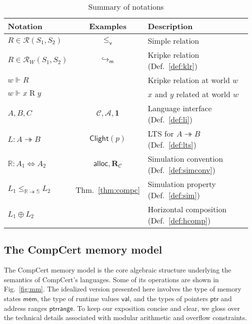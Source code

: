 \documentclass[acmsmall,authordraft]{acmart}
\newcommand{\kw}[1]{\ensuremath{ \mathsf{#1} }}
\newcommand{\que}{\circ}
\newcommand{\ans}{\bullet}
\newcommand{\vref}{\le_\kw{v}}
\begin{document}
\begin{table} %
  \begin{tabular}{lcl}
    \hline
    Notation & Examples & Description \\
    \hline
    $R \in \mathcal{R}(S_1, S_2)$ &
      $\vref$ &
      Simple relation \\
    $R \in \mathcal{R}_W(S_1, S_2)$ &
      $\hookrightarrow_\kw{m}$ &
      Kripke relation (Def.~\ref{def:klr}) \\
    $w \Vdash R$ & &
      Kripke relation at world $w$ \\
    $w \Vdash x \mathrel{R} y$ & &
      $x$ and $y$ related at world $w$ \\
    \hline
    $A, B, C$ &
      $\mathcal{C}, \mathcal{A}, \mathbf{1}$ &
      Language interface (Def.~\ref{def:li}) \\
    $L : A \twoheadrightarrow B$ &
      $\kw{Clight}(p)$ &
      LTS for $A \twoheadrightarrow B$ (Def.~\ref{def:lts}) \\
    $\mathbb{R} : A_1 \Leftrightarrow A_2$ &
      $\kw{alloc}, \mathbf{R}_\mathcal{C}$ &
      Simulation convention (Def.~\ref{def:simconv}) \\
    $L_1 \le_{\mathbb{R} \twoheadrightarrow \mathbb{S}} L_2$ &
      Thm.~\ref{thm:compc} &
      Simulation property (Def.~\ref{def:sim}) \\
    $L_1 \oplus L_2$ & &
      Horizontal composition (Def.~\ref{def:hcomp}) \\
    \hline
  \end{tabular}
  \caption{Summary of notations}
  \label{tbl:notations}
\end{table}

\subsection{The CompCert memory model} \label{sec:sem:mm} %

The CompCert memory model \cite{compcertmm,compcertmmv2}
is the core algebraic structure
underlying the semantics of CompCert's languages.
Some of its operations
are shown in Fig.~\ref{fig:mm}.
The idealized version presented here
involves
the type of memory states \kw{mem},
the type of runtime values \kw{val}, and
the types of pointers \kw{ptr} and address ranges \kw{ptrrange}.
To keep our exposition concise and clear,
we gloss over the technical details
associated with modular arithmetic and overflow constraints.
\end{document}
